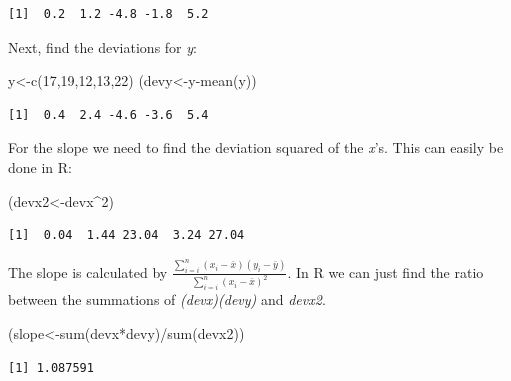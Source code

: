 \documentclass[
  letterpaper,
  DIV=11,
  numbers=noendperiod]{scrreprt}
\newenvironment{Shaded}{\begin{snugshade}}{\end{snugshade}}
\newcommand{\DecValTok}[1]{\textcolor[rgb]{0.68,0.00,0.00}{#1}}
\newcommand{\FunctionTok}[1]{\textcolor[rgb]{0.28,0.35,0.67}{#1}}
\newcommand{\NormalTok}[1]{\textcolor[rgb]{0.00,0.23,0.31}{#1}}
\newcommand{\OtherTok}[1]{\textcolor[rgb]{0.00,0.23,0.31}{#1}}
\newcommand{\SpecialCharTok}[1]{\textcolor[rgb]{0.37,0.37,0.37}{#1}}
\begin{document}
\begin{verbatim}
[1]  0.2  1.2 -4.8 -1.8  5.2
\end{verbatim}

Next, find the deviations for \emph{y}:

\begin{Shaded}
\begin{Highlighting}[numbers=left,,]
\NormalTok{y}\OtherTok{\textless{}{-}}\FunctionTok{c}\NormalTok{(}\DecValTok{17}\NormalTok{,}\DecValTok{19}\NormalTok{,}\DecValTok{12}\NormalTok{,}\DecValTok{13}\NormalTok{,}\DecValTok{22}\NormalTok{)}
\NormalTok{(devy}\OtherTok{\textless{}{-}}\NormalTok{y}\SpecialCharTok{{-}}\FunctionTok{mean}\NormalTok{(y))}
\end{Highlighting}
\end{Shaded}

\begin{verbatim}
[1]  0.4  2.4 -4.6 -3.6  5.4
\end{verbatim}

For the slope we need to find the deviation squared of the \emph{x}'s.
This can easily be done in R:

\begin{Shaded}
\begin{Highlighting}[numbers=left,,]
\NormalTok{(devx2}\OtherTok{\textless{}{-}}\NormalTok{devx}\SpecialCharTok{\^{}}\DecValTok{2}\NormalTok{)}
\end{Highlighting}
\end{Shaded}

\begin{verbatim}
[1]  0.04  1.44 23.04  3.24 27.04
\end{verbatim}

The slope is calculated by
\(\frac{\sum_{i=i}^{n} (x_{i}-\bar{x})(y_{i}-\bar{y})}{\sum_{i=i}^{n} (x_{i}-\bar{x})^2}\).
In R we can just find the ratio between the summations of
\emph{(devx)(devy)} and \emph{devx2}.

\begin{Shaded}
\begin{Highlighting}[numbers=left,,]
\NormalTok{(slope}\OtherTok{\textless{}{-}}\FunctionTok{sum}\NormalTok{(devx}\SpecialCharTok{*}\NormalTok{devy)}\SpecialCharTok{/}\FunctionTok{sum}\NormalTok{(devx2))}
\end{Highlighting}
\end{Shaded}

\begin{verbatim}
[1] 1.087591
\end{verbatim}
\end{document}
